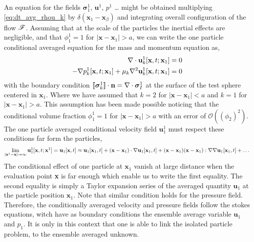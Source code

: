 An equation for the fields $\bm\sigma^1_1$, $\textbf{u}^1$, $p^1$ \ldots 
might be obtained multiplying \ref{eq:dt_avg_rhou_k} by $\delta(\textbf{x}_1 - \textbf{x}_\beta)$ and integrating overall configuration of the flow $\mathscr{F}$. 
Assuming that at the scale of the particles the inertial effects are negligible, and that $\phi_1^1 = 1$ for $|\textbf{x}-\textbf{x}_1|>a$, we can write the one particle conditional averaged equation for the mass and momentum equation as, 
\begin{align}
    \mathbf{\nabla}\cdot \textbf{u}^1_k[\textbf{x},t;\textbf{x}_1]=0\\
    -\mathbf{\nabla} p_k^1[\textbf{x},t;\textbf{x}_1] 
    + \mu_k \mathbf{\nabla}^2 \textbf{u}_k^1[\textbf{x},t;\textbf{x}_1]
    = 0
\end{align}
with the boundary condition $\llbracket \bm\sigma^1_k \rrbracket \cdot \textbf{n} = \mathbf{\nabla}\cdot \bm\sigma_I^1$ at the surface of the test sphere centered in $\textbf{x}_1$.
Where we have assumed that $k=2$ for $|\textbf{x}-\textbf{x}_1|<a$ and $k=1$ for $|\textbf{x}-\textbf{x}_1|>a$.
This assumption has been made possible noticing that the conditional volume fraction $\phi_1^1 = 1$ for $|\textbf{x}-\textbf{x}_1|>a$ with an error of $\mathcal{O}((\phi_2)^2)$. 
The one particle averaged conditional velocity field $\textbf{u}_1^1$ must respect these conditions far form the particles, 
\begin{align*}
    \lim_{|\textbf{x}^1 - \textbf{x}| \to \infty} \textbf{u}_1^1[\textbf{x},t;\textbf{x}^1] = \textbf{u}_1[\textbf{x},t]
    \approx \textbf{u}_1[\textbf{x}_1,t] + (\textbf{x} - \textbf{x}_1)\cdot \mathbf{\nabla} \textbf{u}_1[\textbf{x}_1,t] + (\textbf{x} - \textbf{x}_1)(\textbf{x} - \textbf{x}_1): \mathbf{\nabla}\mathbf{\nabla} \textbf{u}_1[\textbf{x}_1,t] + \ldots 
\end{align*}
The conditional effect of one particle at $\textbf{x}_1$ vanish at large distance when the evaluation point \textbf{x} is far enough which enable us to write the first equality. 
The second equality is simply a Taylor expansion series of the averaged quantity $\textbf{u}_1$ at the particle position $\textbf{x}_1$.  
Note that similar condition holds for the pressure field. 
Therefore, the conditionally averaged velocity and pressure fields follow the stokes equations, witch have as boundary conditions the ensemble average variable $\textbf{u}_1$ and $p_1$. 
It is only in this context that one is able to link the isolated particle problem, to the ensemble averaged unknown.
 

